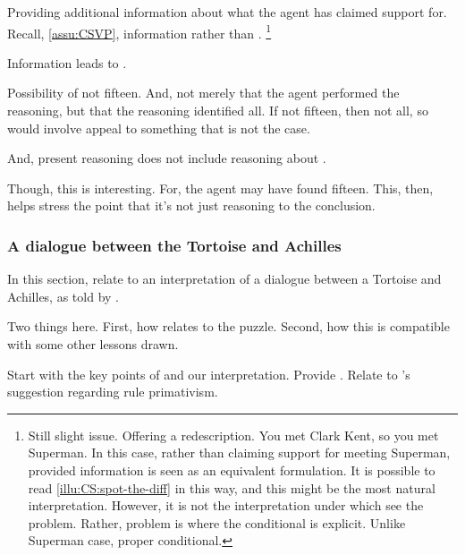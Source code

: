 \begin{note}
    Providing additional information about what the agent has claimed support for.
  Recall, \autoref{assu:CSVP}, information rather than \world{}.
  \nolinebreak
  \footnote{
    Still slight issue.
    Offering a redescription.
    You met Clark Kent, so you met Superman.
    In this case, rather than claiming support for meeting Superman, provided information is seen as an equivalent formulation.
    It is possible to read \autoref{illu:CS:spot-the-diff} in this way, and this might be the most natural interpretation.
    However, it is not the interpretation under which see the problem.
    Rather, problem is where the conditional is explicit.
    Unlike Superman case, proper conditional.
  }
\end{note}

\begin{note}
  Information leads to \requ{}.

  Possibility of not fifteen.
  And, not merely that the agent performed the reasoning, but that the reasoning identified all.
  If not fifteen, then not all, so would involve appeal to something that is not the case.

  And, present reasoning does not include reasoning about \requ{}.
\end{note}

\begin{note}
  \color{red}
  Though, this is interesting.
  For, the agent may have found fifteen.
  This, then, helps stress the point that it's not just reasoning to the conclusion.
\end{note}

\subsubsection[The Tortoise and Achilles]{A dialogue between the Tortoise and Achilles}
\label{cha:zS:sec:question:illu:carroll}

\begin{note}
  In this section, relate \qzS{} to an interpretation of a dialogue between a Tortoise and Achilles, as told by \textcite{Carroll:1895uj}.

  Two things here.
  First, how \qzS{} relates to the puzzle.
  Second, how this is compatible with some other lessons drawn.

  Start with the key points of \textcite{Carroll:1895uj} and our interpretation.
  Provide .
  Relate to \citeauthor{Boghossian:2008vf}'s suggestion regarding rule primativism.
\end{note}

